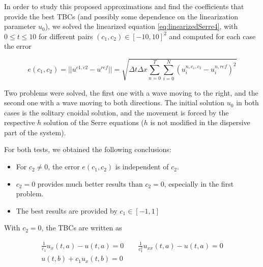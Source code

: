 \indent In order to study this proposed approximations and find the coefficients that provide the best TBCs (and possibly some dependence on the linearization parameter $u_0$), we solved the linearized equation \eqref{eq:linearizedSerre4}, with $0 \leq t \leq 10$ for different pairs $(c_1,c_2) \in [-10,10]^2$ and computed for each case the error

\begin{equation*}
e(c_1,c_2) = ||u^{c1,c2}-u^{ref}|| = \sqrt{\Delta t \Delta x \sum_{n=0}^T {\sum_{i=0}^N{(u_i^{n,c_1,c_2} - u_i^{n,ref})^2} }}
\end{equation*}

\indent Two problems were solved, the first one with a wave moving to the right, and the second one with a wave moving to both directions. The initial solution $u_0$ in both cases is the solitary cnoidal solution, and the movement is forced by the respective $h$ solution of the Serre equations ($h$ is not modified in the dispersive part of the system).

\indent For both tests, we obtained the following conclusions:

\begin{itemize}
\item For $c_2 \neq 0$, the error  $e(c_1,c_2)$ is independent of $c_2$.
\item $c_2 = 0$ provides much better results than $c_2 = 0$, especially in the first problem.
\item The best results are provided by $c_1 \in [-1,1]$ 
\end{itemize}

\indent With $c_2 = 0$, the TBCs are written as

\begin{gather*}
\frac{1}{c_1}u_{x}(t,a) -  u(t,a) = 0 \qquad \frac{1}{c_1^2}u _{xx}(t,a) - u(t,a) = 0 \\
u(t,b) + c_1 u_x(t,b)  = 0 \\
\end{gather*}
